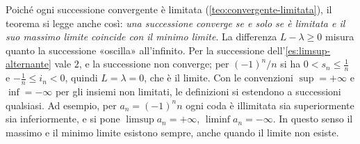 \begin{osservazione}\label{oss:limsup-illimitate}
Poiché ogni successione convergente è limitata (\cref{teo:convergente-limitata}), il
teorema si legge anche così: \emph{una successione converge se e solo se è limitata e
il suo massimo limite coincide con il minimo limite}. La differenza $L-\lambda\ge0$
misura quanto la successione «oscilla» all'infinito. Per la successione
dell'\cref{es:limsup-alternante} vale $2$, e la successione non converge; per
$(-1)^{n}/n$ si ha $0<s_{n}\le\frac1n$ e $-\frac1n\le i_{n}<0$, quindi $L=\lambda=0$, che
è il limite. Con le convenzioni $\sup=+\infty$ e $\inf=-\infty$ per gli insiemi non
limitati, le definizioni si estendono a successioni qualsiasi. Ad esempio, per
$a_{n}=(-1)^{n}n$ ogni coda è illimitata sia superiormente sia inferiormente, e si pone
$\limsup a_{n}=+\infty$, $\liminf a_{n}=-\infty$. In questo senso il massimo e il minimo
limite esistono sempre, anche quando il limite non esiste.
\end{osservazione}
